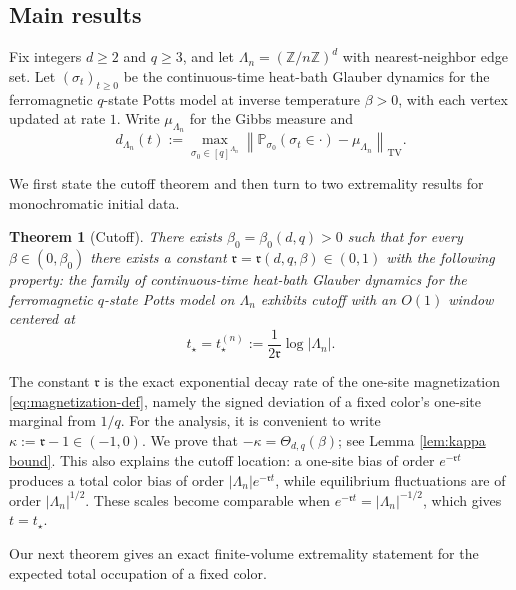 \documentclass[letterpaper,11pt,reqno]{amsart}
\newtheorem{thm}{Theorem}[section]
\theoremstyle{definition}
\begin{document}
\subsection{Main results}

Fix integers $d\ge2$ and $q\ge3$, and let $\Lambda_n=(\mathbb Z/n\mathbb Z)^d$ with nearest-neighbor
edge set. Let $(\sigma_t)_{t\ge0}$ be the continuous-time heat-bath Glauber dynamics for the
ferromagnetic $q$-state Potts model at inverse temperature $\beta>0$, with each vertex updated at
rate $1$. Write $\mu_{\Lambda_n}$ for the Gibbs measure and
\[
d_{\Lambda_n}(t):=
\max_{\sigma_0\in[q]^{\Lambda_n}}
\left\|
\mathbb P_{\sigma_0}(\sigma_t\in\cdot)-\mu_{\Lambda_n}
\right\|_{\mathrm{TV}}.
\]

We first state the cutoff theorem and then turn to two extremality results for monochromatic initial data.


\begin{thm}[Cutoff]\label{thm:main}
There exists \(\beta_0=\beta_0(d,q)>0\) such that for every \(\beta\in(0,\beta_0)\) there exists a
constant \(\mathfrak{r}=\mathfrak{r}(d,q,\beta)\in(0,1)\) with the following property: the family of
continuous-time heat-bath Glauber dynamics for the ferromagnetic \(q\)-state Potts model on
\(\Lambda_n\) exhibits cutoff with an \(O(1)\) window centered at
\begin{equation}\label{eq:tstar-def}
t_\star=t_\star^{(n)}:=\frac{1}{2\mathfrak{r}}\log |\Lambda_n| .
\end{equation}
\end{thm}
The constant \(\mathfrak r\) is the exact exponential decay rate of the one-site magnetization \eqref{eq:magnetization-def}, namely the signed deviation of a fixed color's one-site
marginal from \(1/q\). For the analysis, it is convenient to write 
\(\kappa:=\mathfrak r-1\in(-1,0)\). We prove that $-\kappa=\Theta_{d,q}(\beta)$; see Lemma \ref{lem:kappa bound}.
This also explains the cutoff location: a one-site bias of order
\(e^{-\mathfrak{r}t}\) produces a total color bias of order
\(|\Lambda_n|e^{-\mathfrak{r}t}\), while equilibrium fluctuations are of
order \(|\Lambda_n|^{1/2}\). These scales become comparable when 
$e^{-\mathfrak{r}t}=|\Lambda_n|^{-1/2}$,
which gives \(t=t_\star\).






\smallskip

Our next theorem gives an exact finite-volume extremality statement for the expected total occupation of a fixed color.
\end{document}
